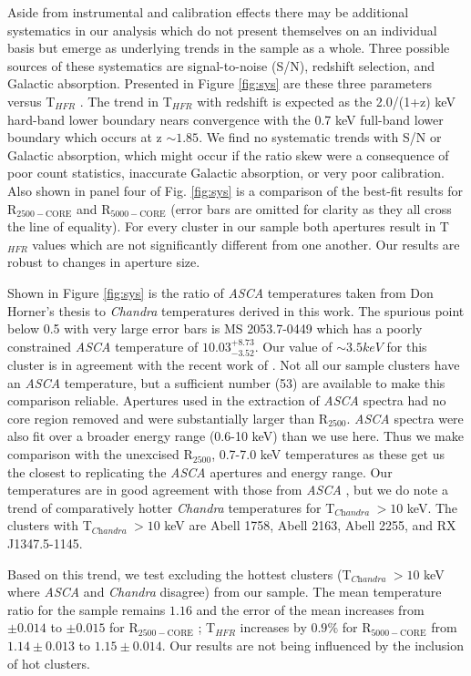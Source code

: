 \documentclass{emulateapj}
\newcommand{\tf}{T$_{HFR}$ }
\newcommand{\rtwf}{R$_{2500-\text{CORE}}$ }
\newcommand{\rfif}{R$_{5000-\text{CORE}}$ }
\newcommand{\chan}{{\textit{Chandra }}}
\newcommand{\asca}{{\textit{ASCA }}}
\begin{document}
Aside from instrumental and calibration effects there may be
additional systematics in our analysis which do not present themselves
on an individual basis but emerge as underlying trends in the sample
as a whole. Three possible sources of these systematics
are signal-to-noise (S/N), redshift selection, and Galactic
absorption. Presented in Figure \ref{fig:sys} are these three
parameters versus \tf. The trend in \tf with redshift is expected
as the 2.0/(1+z) keV hard-band lower boundary nears convergence with
the 0.7 keV full-band lower boundary which occurs at z $\sim 1.85$. We
find no systematic trends with S/N or Galactic absorption, which might
occur if the ratio skew were a consequence of poor count statistics,
inaccurate Galactic absorption, or very poor calibration. Also
shown in panel four of Fig. \ref{fig:sys} is a comparison of the
best-fit results for \rtwf and \rfif (error bars are omitted for
clarity as they all cross the line of equality). For every cluster in
our sample both apertures result in \tf values which are not
significantly different from one another. Our results are robust to
changes in aperture size.

Shown in Figure \ref{fig:sys} is the ratio of \asca
temperatures taken from Don Horner's thesis to \chan
temperatures derived in this work. The spurious point below 0.5 with
very large error bars is MS 2053.7-0449 which has a poorly
constrained \asca temperature of $10.03^{+8.73}_{-3.52}$. Our value of
$\sim 3.5 keV$ for this cluster is in agreement with the recent work of
\cite{2007astro.ph..3156M}. Not all our sample clusters have an \asca
temperature, but a sufficient number (53) are available to make this
comparison reliable. Apertures used in the extraction of \asca spectra
had no core region removed and were substantially larger than
R$_{2500}$. \asca spectra were also fit over a broader energy range
(0.6-10 keV) than we use here. Thus we make comparison with the unexcised
R$_{2500}$, 0.7-7.0 keV temperatures as these get us
the closest to replicating the \asca apertures and energy range. Our
temperatures are in good agreement with those from \asca, but we do
note a trend of comparatively hotter \chan temperatures for T$_{\chan}
> 10$ keV. The clusters with T$_{\chan} > 10$ keV are Abell 1758,
Abell 2163, Abell 2255, and RX J1347.5-1145.

Based on this trend, we test excluding the hottest clusters
(T$_{\chan} > 10$ keV where \asca and \chan disagree) from our sample.
The mean temperature ratio for the sample remains $1.16$ and the error
of the mean increases from $\pm 0.014$ to $\pm 0.015$ for
\rtwf; \tf increases by $0.9\%$ for \rfif from $1.14\pm 0.013$ to
$1.15\pm 0.014$. Our results are not being influenced by the inclusion
of hot clusters.
\end{document}
